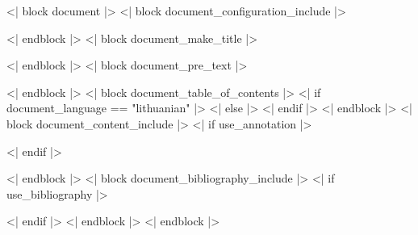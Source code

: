 \documentclass[<< document_class_args >>]{<< document_class >>}
\begin{document}
<| block document |>
<| block document_configuration_include |>
  
<| endblock |>
<| block document_make_title |>
  \maketitle
<| endblock |>
<| block document_pre_text |>
  
<| endblock |>
<| block document_table_of_contents |>
  <| if document_language == "lithuanian" |>
  <| else |>
  <| endif |>
  {
    \singlespacing
    \tableofcontents
  }
<| endblock |>
<| block document_content_include |>
  \pagestyle{plain}
  <| if use_annotation |>
  
  <| endif |>
  
<| endblock |>
<| block document_bibliography_include |>
  <| if use_bibliography |>
  \nocite{*}

  \Bibliography
  <| endif |>
<| endblock |>
<| endblock |>
\end{document}
